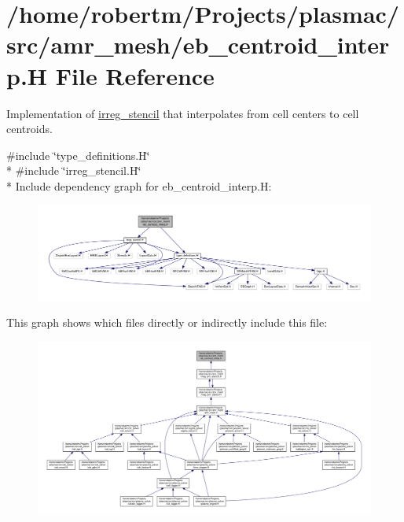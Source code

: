 \hypertarget{eb__centroid__interp_8H}{}\section{/home/robertm/\+Projects/plasmac/src/amr\+\_\+mesh/eb\+\_\+centroid\+\_\+interp.H File Reference}
\label{eb__centroid__interp_8H}


Implementation of \hyperlink{classirreg__stencil}{irreg\+\_\+stencil} that interpolates from cell centers to cell centroids.  


{\ttfamily \#include \char`\"{}type\+\_\+definitions.\+H\char`\"{}}\\*
{\ttfamily \#include \char`\"{}irreg\+\_\+stencil.\+H\char`\"{}}\\*
Include dependency graph for eb\+\_\+centroid\+\_\+interp.\+H\+:\nopagebreak
\begin{figure}[H]
\begin{center}
\leavevmode
\includegraphics[width=350pt]{eb__centroid__interp_8H__incl}
\end{center}
\end{figure}
This graph shows which files directly or indirectly include this file\+:\nopagebreak
\begin{figure}[H]
\begin{center}
\leavevmode
\includegraphics[width=350pt]{eb__centroid__interp_8H__dep__incl}
\end{center}
\end{figure}
